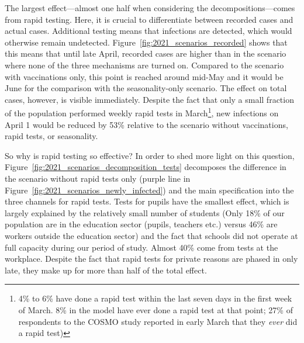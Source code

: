 The largest effect---almost one half when considering the decompositions---comes from
rapid testing. Here, it is crucial to differentiate between recorded cases and actual
cases. Additional testing means that infections are detected, which would otherwise
remain undetected. Figure~\ref{fig:2021_scenarios_recorded} shows that this means that
until late April, recorded cases are higher than in the scenario where none of the three
mechanisms are turned on. Compared to the scenario with vaccinations only, this point is
reached around mid-May and it would be June for the comparison with the seasonality-only
scenario. The effect on total cases, however, is visible immediately. Despite the fact
that only a small fraction of the population performed weekly rapid tests in
March\footnote{4\% to 6\% have done a rapid test within the last seven days in the first
week of March. 8\% in the model have ever done a rapid test at that point; 27\% of
respondents to the COSMO study reported in early March that they \textit{ever} did a
rapid test)}, new infections on April 1 would be reduced by 53\% relative to the scenario
without vaccinations, rapid tests, or seasonality.

So why is rapid testing so effective? In order to shed more light on this question,
Figure~\ref{fig:2021_scenarios_decomposition_tests} decomposes the difference in the
scenario without rapid tests only (purple line in
Figure~\ref{fig:2021_scenarios_newly_infected}) and the main specification into the three
channels for rapid tests. Tests for pupils have the smallest effect, which is largely
explained by the relatively small number of students (Only 18\% of our population are in
the education sector (pupils, teachers etc.) versus  46\% are workers outside the
education sector) and the fact that schools did not operate at full capacity during our
period of study. Almost 40\% come from tests at the workplace. Despite the fact that rapid tests for private reasons are phased in only late, they make up for more than
half of the total effect.

